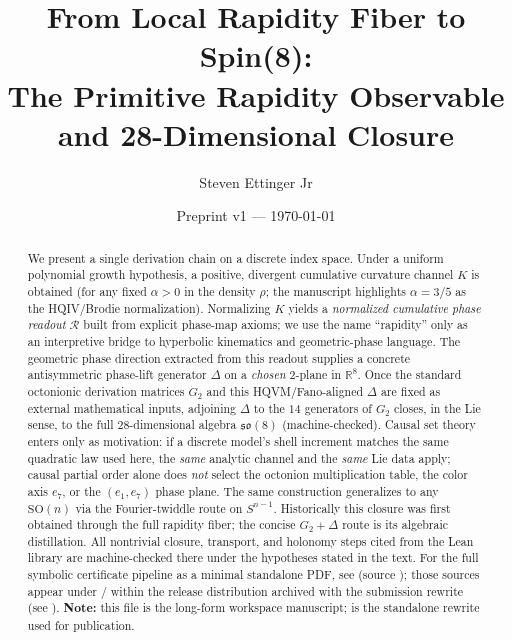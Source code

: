 \documentclass[11pt]{amsart}
\title[Local Rapidity Fiber to Spin(8)]{From Local Rapidity Fiber to Spin(8):\\
The Primitive Rapidity Observable and 28-Dimensional Closure}
\author{Steven Ettinger Jr}
\date{Preprint v1 --- \today}
\begin{document}
\begin{abstract}
We present a single derivation chain on a discrete index space. Under a uniform polynomial growth hypothesis, a positive, divergent cumulative curvature channel \(K\) is obtained (for any fixed \(\alpha>0\) in the density \(\rho\); the manuscript highlights \(\alpha=3/5\) as the HQIV/Brodie normalization). Normalizing \(K\) yields a \emph{normalized cumulative phase readout} \(\mathcal{R}\) built from explicit phase-map axioms; we use the name ``rapidity'' only as an interpretive bridge to hyperbolic kinematics and geometric-phase language. The geometric phase direction extracted from this readout supplies a concrete antisymmetric phase-lift generator \(\Delta\) on a \emph{chosen} \(2\)-plane in \(\mathbb{R}^8\). Once the standard octonionic derivation matrices \(G_2\) and this HQVM/Fano-aligned \(\Delta\) are fixed as external mathematical inputs, adjoining \(\Delta\) to the \(14\) generators of \(G_2\) closes, in the Lie sense, to the full \(28\)-dimensional algebra \(\mathfrak{so}(8)\) (machine-checked). Causal set theory enters only as motivation: if a discrete model's shell increment matches the same quadratic law used here, the \emph{same} analytic channel and the \emph{same} Lie data apply; causal partial order alone does \emph{not} select the octonion multiplication table, the color axis \(e_7\), or the \((e_1,e_7)\) phase plane. The same construction generalizes to any \(\mathrm{SO}(n)\) via the Fourier-twiddle route on \(S^{n-1}\). Historically this closure was first obtained through the full rapidity fiber; the concise \(G_2+\Delta\) route is its algebraic distillation. All nontrivial closure, transport, and holonomy steps cited from the Lean library are machine-checked there under the hypotheses stated in the text. For the full symbolic certificate pipeline as a minimal standalone PDF, see  (source ); those sources appear under \PaperReproBundleDir/ within the release distribution \ReleaseDistArchive{} archived with the submission rewrite  (see \PaperReproBundleManifest). \textbf{Note:} this file is the long-form workspace manuscript;  is the standalone rewrite used for publication.
\end{abstract}
\maketitle


\end{document}
